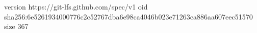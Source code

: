 version https://git-lfs.github.com/spec/v1
oid sha256:6e5261934000776c2c52767dba6e98ca4046b023e71263ca886aa607eec51570
size 367
